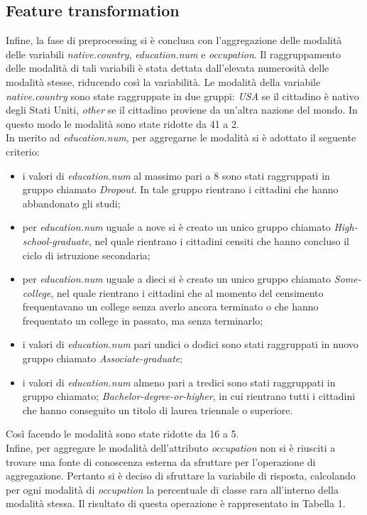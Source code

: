\documentclass[fleqn,10pt]{SelfArx}
\begin{document}
\subsection{Feature transformation}
Infine, la fase di preprocessing si è conclusa con l'aggregazione delle modalità delle variabili \textit{native.country}, \textit{education.num} e \textit{occupation}. Il raggruppamento delle modalità di tali variabili è stata dettata dall'elevata numerosità delle modalità stesse, riducendo così la variabilità. Le modalità della variabile \textit{native.country} sono state raggruppate in due gruppi: \textit{USA} se il cittadino è nativo degli Stati Uniti, \textit{other} se il cittadino proviene da un'altra nazione del mondo. In questo modo le modalità sono state ridotte da 41 a 2.
\\
In merito ad \textit{education.num}, per aggregarne le modalità si è adottato il seguente criterio: 
\begin{itemize}
    \item i valori di \textit{education.num} al massimo pari a 8 sono stati raggruppati in gruppo chiamato \textit{Dropout}. In tale gruppo rientrano i cittadini che hanno abbandonato gli studi;
    \item per \textit{education.num} uguale a nove si è creato un unico gruppo chiamato \textit{High-school-graduate}, nel quale rientrano i cittadini censiti che hanno concluso il ciclo di istruzione secondaria;
    \item per \textit{education.num} uguale a dieci si è creato un unico gruppo chiamato \textit{Some-college}, nel quale rientrano i cittadini che al momento del censimento frequentavano un college senza averlo ancora terminato o che hanno frequentato un college in passato, ma senza terminarlo;
    \item i valori di \textit{education.num} pari undici o dodici sono stati raggruppati in nuovo gruppo chiamato \textit{Associate-graduate};
    \item i valori di \textit{education.num} almeno pari a tredici sono stati raggruppati in gruppo chiamato; \textit{Bachelor-degree-or-higher}, in cui rientrano tutti i cittadini che hanno conseguito un titolo di laurea triennale o superiore.
\end{itemize}
Così facendo le modalità sono state ridotte da 16 a 5.\\
Infine, per aggregare le modalità dell'attributo \textit{occupation} non si  è riusciti a trovare una fonte di conoscenza esterna da sfruttare per l'operazione di aggregazione. Pertanto si è deciso di sfruttare la variabile di risposta, calcolando per ogni modalità di \textit{occupation} la percentuale di classe rara all'interno della modalità stessa. Il risultato di questa operazione è rappresentato in Tabella 1.
\end{document}
